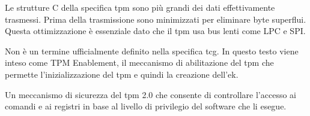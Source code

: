 \begin{description}[itemsep=2.5ex, parsep=0.5ex, leftmargin=2.5cm, style=nextline]
    \item[\textbf{Dati canonicalizzati}] Le strutture C della specifica \acrshort{tpm} sono più grandi dei dati effettivamente trasmessi. Prima della trasmissione sono minimizzati per eliminare byte superflui. Questa ottimizzazione è essenziale dato che il \acrshort{tpm} usa bus lenti come LPC e SPI.

    \item[\textbf{\acrshort{tpme}}] Non è un termine ufficialmente definito nella specifica \acrshort{tcg}. In questo testo viene inteso come TPM Enablement, il meccanismo di abilitazione del \acrshort{tpm} che permette l’inizializzazione del \acrshort{tpm} e quindi la creazione dell’\acrshort{ek}.

    \item[\textbf{Locality}] Un meccanismo di sicurezza del \acrshort{tpm} 2.0 che consente di controllare l’accesso ai comandi e ai registri in base al livello di privilegio del software che li esegue.

\end{description}